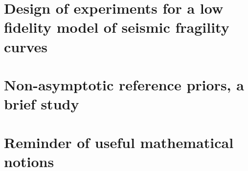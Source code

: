 \documentclass[a4paper]{book}
\begin{document}


\chapter{Design of experiments for a low fidelity model of seismic fragility curves}\label{app:chap:ESAIM}




\chapter{Non-asymptotic reference priors, a brief study}




\chapter{Reminder of useful mathematical notions}

 
 

\printbibliography[heading=chapter,title=Bibliography]
\end{document}
